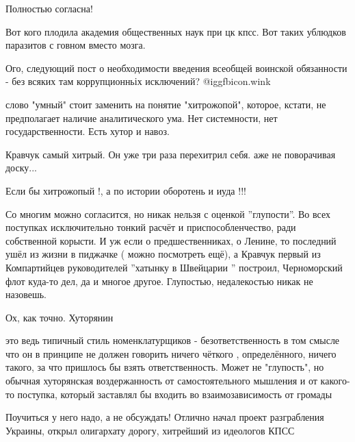 \begin{itemize}
Полностью согласна!

Вот кого плодила академия общественных наук при цк кпсс. Вот таких ублюдков паразитов с говном вместо мозга.

Ого, следующий пост о необходимости введения всеобщей воинской обязанности - без всяких там коррупционньіх исключений?  @igg{fbicon.wink} 


слово "умный" стоит заменить на понятие "хитрожопой", которое, кстати, не
предполагает наличие аналитического ума. Нет системности, нет
государственности. Есть хутор и навоз.

Кравчук самый хитрый. Он уже три раза перехитрил себя. аже не поворачивая доску...

Если бы хитрожопый !, а по истории оборотень и иуда !!!


Со многим можно согласится, но никак нельзя с оценкой ''глупости''. Во всех
поступках исключительно тонкий расчёт и приспособленчество, ради собственной
корысти. И уж если о предшественниках, о Ленине, то последний ушёл из жизни в
пиджачке ( можно посмотреть ещё), а Кравчук первый из Компартийцев
руководителей ''хатынку в Швейцарии '' построил, Черноморский флот куда-то
дел, да и многое другое. Глупостью, недалекостью никак не назовешь.

Ох, как точно. Хуторянин


это ведь типичный стиль номенклатурщиков - безответственность в том смысле что
он в принципе не должен говорить ничего чёткого , определённого, ничего такого,
за что пришлось бы взять ответственность. Может не "глупость", но обычная
хуторянская воздержанность от самостоятельного мышления и от какого-то
поступка, который заставлял бы входить во взаимозависимость от громады


Поучиться у него надо, а не обсуждать!
Отлично начал проект разграбления Украины, открыл олигархату дорогу, хитрейший из идеологов КПСС

\end{itemize} %
